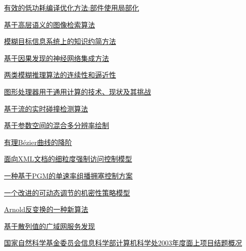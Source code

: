 \documentclass[a4paper]{article}
\begin{document}
\href{http://www.jos.org.cn/ch/reader/download_pdf.aspx?file_no=20041004&year_id=2004&quarter_id=10&falg=1}{有效的低功耗编译优化方法:部件使用局部化}

\href{http://www.jos.org.cn/ch/reader/download_pdf.aspx?file_no=20041005&year_id=2004&quarter_id=10&falg=1}{基于高层语义的图像检索算法}

\href{http://www.jos.org.cn/ch/reader/download_pdf.aspx?file_no=20041006&year_id=2004&quarter_id=10&falg=1}{模糊目标信息系统上的知识约简方法}

\href{http://www.jos.org.cn/ch/reader/download_pdf.aspx?file_no=20041007&year_id=2004&quarter_id=10&falg=1}{基于因果发现的神经网络集成方法}

\href{http://www.jos.org.cn/ch/reader/download_pdf.aspx?file_no=20041008&year_id=2004&quarter_id=10&falg=1}{两类模糊推理算法的连续性和逼近性}

\href{http://www.jos.org.cn/ch/reader/download_pdf.aspx?file_no=20041009&year_id=2004&quarter_id=10&falg=1}{图形处理器用于通用计算的技术、现状及其挑战}

\href{http://www.jos.org.cn/ch/reader/download_pdf.aspx?file_no=20041010&year_id=2004&quarter_id=10&falg=1}{基于流的实时碰撞检测算法}

\href{http://www.jos.org.cn/ch/reader/download_pdf.aspx?file_no=20041011&year_id=2004&quarter_id=10&falg=1}{基于参数空间的混合多分辨率绘制}

\href{http://www.jos.org.cn/ch/reader/download_pdf.aspx?file_no=20041012&year_id=2004&quarter_id=10&falg=1}{有理Bézier曲线的降阶}

\href{http://www.jos.org.cn/ch/reader/download_pdf.aspx?file_no=20041013&year_id=2004&quarter_id=10&falg=1}{面向XML文档的细粒度强制访问控制模型}

\href{http://www.jos.org.cn/ch/reader/download_pdf.aspx?file_no=20041014&year_id=2004&quarter_id=10&falg=1}{一种基于PGM的单速率组播拥塞控制方案}

\href{http://www.jos.org.cn/ch/reader/download_pdf.aspx?file_no=20041015&year_id=2004&quarter_id=10&falg=1}{一个改进的可动态调节的机密性策略模型}

\href{http://www.jos.org.cn/ch/reader/download_pdf.aspx?file_no=20041016&year_id=2004&quarter_id=10&falg=1}{Arnold反变换的一种新算法}

\href{http://www.jos.org.cn/ch/reader/download_pdf.aspx?file_no=20041017&year_id=2004&quarter_id=10&falg=1}{基于散列值的广域网服务发现}

\href{http://www.jos.org.cn/ch/reader/download_pdf.aspx?file_no=20041018&year_id=2004&quarter_id=10&falg=1}{国家自然科学基金委员会信息科学部计算机科学处2003年度面上项目结题概况}
\end{document}
